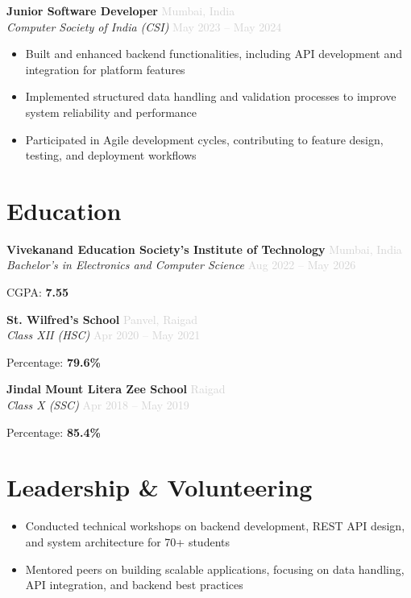\documentclass[10pt, a4paper]{article}
\newcommand{\resumeEntry}[4]{%
  \noindent\textbf{#1} \hfill \textcolor{lightgray}{#3} \\
  \textit{#2} \hfill \textcolor{lightgray}{#4}
  \vspace{1pt}
}
\begin{document}
\resumeEntry
  {Junior Software Developer}
  {Computer Society of India (CSI)}
  {Mumbai, India}
  {May 2023 -- May 2024}
\begin{itemize}
  \item Built and enhanced backend functionalities, including API development and integration for platform features
  \item Implemented structured data handling and validation processes to improve system reliability and performance
  \item Participated in Agile development cycles, contributing to feature design, testing, and deployment workflows
  
\end{itemize}


\section{Education}

\resumeEntry
  {Vivekanand Education Society's Institute of Technology}
  {Bachelor's in Electronics and Computer Science}
  {Mumbai, India}
  {Aug 2022 -- May 2026}

\noindent CGPA: \textbf{7.55}

\vspace{4pt}

\resumeEntry
  {St. Wilfred's School}
  {Class XII (HSC)}
  {Panvel, Raigad}
  {Apr 2020 -- May 2021}

\noindent Percentage: \textbf{79.6\%}

\vspace{4pt}

\resumeEntry
  {Jindal Mount Litera Zee School}
  {Class X (SSC)}
  {Raigad}
  {Apr 2018 -- May 2019}

\noindent Percentage: \textbf{85.4\%}

\section{Leadership \& Volunteering}

\begin{itemize}
  \item Conducted technical workshops on backend development, REST API design, and system architecture for 70+ students
  \item Mentored peers on building scalable applications, focusing on data handling, API integration, and backend best practices
\end{itemize}
\end{document}
